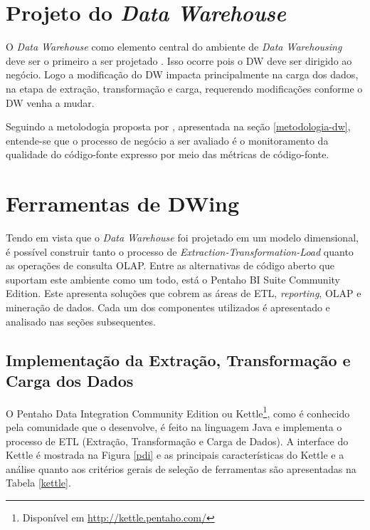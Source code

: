 

\section{Projeto do \textit{Data Warehouse}}

O \textit{Data Warehouse} como elemento central do ambiente de \textit{Data Warehousing} deve ser o primeiro a ser projetado \cite{Kimball2002}. Isso ocorre pois o DW deve ser dirigido ao negócio. Logo a modificação do DW impacta principalmente na carga dos dados, na etapa de extração, transformação e carga, requerendo modificações conforme o DW venha a mudar.

Seguindo a metolodogia proposta por , apresentada na seção \ref{metodologia-dw}, entende-se que o processo de negócio a ser avaliado é o monitoramento da qualidade do código-fonte expresso por meio das métricas de código-fonte. 





\section{Ferramentas de DWing}

Tendo em vista que o \textit{Data Warehouse} foi projetado em um modelo dimensional, é possível construir tanto o processo de \textit{Extraction-Transformation-Load} quanto as operações de consulta OLAP. Entre as alternativas de código aberto que suportam este ambiente como um todo, está o Pentaho BI Suite Community Edition. Este apresenta soluções que cobrem 
as áreas de ETL, \textit{reporting}, OLAP e mineração de dados. Cada um dos componentes utilizados é apresentado e analisado nas seções subsequentes.
 


\subsection{Implementação da Extração, Transformação e Carga dos Dados}
\label{implementação-ETL}
O Pentaho Data Integration Community Edition ou Kettle\footnote{Disponível em \url{http://kettle.pentaho.com/}}, como é conhecido pela comunidade que o desenvolve, é feito na linguagem Java e implementa o processo de ETL (Extração, Transformação e Carga de Dados). A interface do Kettle é mostrada na Figura \ref{pdi} e as principais características do Kettle e a análise quanto aos critérios gerais de seleção de ferramentas são apresentadas na Tabela \ref{kettle}.

